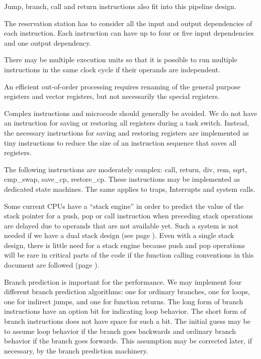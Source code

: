 \documentclass[forwardcom.tex]{subfiles}
\begin{document}
Jump, branch, call and return instructions also fit into this pipeline design. 
\vspace{2mm}

The reservation station has to consider all the input and output dependencies of each instruction. Each instruction can have up to four or five input dependencies and one output dependency. 
\vspace{2mm}

There may be multiple execution units so that it is possible to run multiple instructions in the same clock cycle if their operands are independent. 
\vspace{2mm}

An efficient out-of-order processing requires renaming of the general purpose registers and vector registers, but not necessarily the special registers. 
\vspace{2mm}

Complex instructions and microcode should generally be avoided. We do not have an instruction for saving or restoring all registers during a task switch. Instead, the necessary instructions for saving and restoring registers are implemented as tiny instructions to reduce the size of an instruction sequence that saves all registers. 
\vspace{2mm}

The following instructions are moderately complex: call, return, div, rem, sqrt, cmp\_swap, save\_cp, restore\_cp. These instructions may be implemented as dedicated state machines. The same applies to traps, Interrupts and system calls. 
\vspace{2mm}

Some current CPUs have a ``stack engine'' in order to predict the value of the stack pointer for a push, pop or call instruction when preceding stack operations are delayed due to operands that are not available yet. Such a system is not needed if we have a dual stack design (see page \pageref{dualStack}). Even with a single stack design, there is little need for a stack engine because push and pop operations will be rare in critical parts of the code if the function calling conventions in this document are followed (page \pageref{functionCallingConventions}). 
\vspace{2mm}

Branch prediction is important for the performance. We may implement four different branch prediction algorithms: one for ordinary branches, one for loops, one for indirect jumps, and one for function returns. The long form of branch instructions have an option bit for indicating loop behavior. The short form of branch instructions does not have space for such a bit. The initial guess may be to assume loop behavior if the branch goes backwards and ordinary branch behavior if the branch goes forwards. This assumption may be corrected later, if necessary, by the branch prediction machinery. 
\vspace{2mm}
\end{document}
